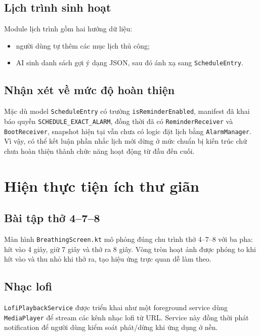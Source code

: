\documentclass{zenbuddy-report}
\begin{document}
\subsection{Lịch trình sinh hoạt}
Module lịch trình gồm hai hướng dữ liệu:
\begin{itemize}
  \item người dùng tự thêm các mục lịch thủ công;
  \item AI sinh danh sách gợi ý dạng JSON, sau đó ánh xạ sang \texttt{ScheduleEntry}.
\end{itemize}


\subsection{Nhận xét về mức độ hoàn thiện}
Mặc dù model \texttt{ScheduleEntry} có trường \texttt{isReminderEnabled}, manifest đã khai báo quyền \texttt{SCHEDULE\_EXACT\_ALARM}, đồng thời đã có \texttt{ReminderReceiver} và \texttt{BootReceiver}, snapshot hiện tại vẫn chưa có logic đặt lịch bằng \texttt{AlarmManager}. Vì vậy, có thể kết luận phần nhắc lịch mới dừng ở mức chuẩn bị kiến trúc chứ chưa hoàn thiện thành chức năng hoạt động từ đầu đến cuối.

\section{Hiện thực tiện ích thư giãn}
\subsection{Bài tập thở 4--7--8}
Màn hình \texttt{BreathingScreen.kt} mô phỏng đúng chu trình thở 4--7--8 với ba pha: hít vào 4 giây, giữ 7 giây và thở ra 8 giây. Vòng tròn hoạt ảnh được phóng to khi hít vào và thu nhỏ khi thở ra, tạo hiệu ứng trực quan dễ làm theo.


\subsection{Nhạc lofi}
\texttt{LofiPlaybackService} được triển khai như một foreground service dùng \texttt{MediaPlayer} để stream các kênh nhạc lofi từ URL. Service này đồng thời phát notification để người dùng kiểm soát phát/dừng khi ứng dụng ở nền.
\end{document}
